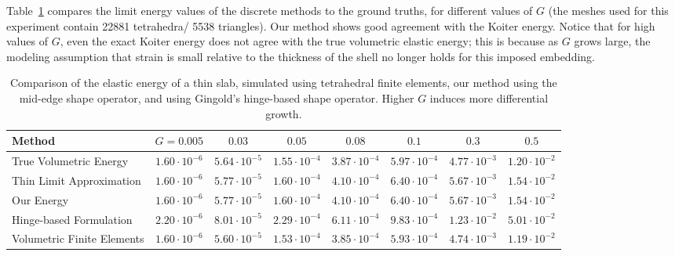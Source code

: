 \documentclass[timestamp,acmtog]{acmart}
\begin{document}
Table~\ref{tab:energy} compares the limit energy values of the discrete methods to the ground truths, for different values of $G$ (the meshes used for this experiment contain 22881 tetrahedra/ 5538 triangles).  Our method shows good agreement with the Koiter energy. Notice that for high values of $G$, even the exact Koiter energy does not agree with the true volumetric elastic energy; this is because as $G$ grows large, the modeling assumption that strain is small relative to the thickness of the shell no longer holds for this imposed embedding.
\begin{table}
\begin{tabular}{l|ccccccc}
Method & $G=0.005$ & $0.03$ & $0.05$ & $0.08$ & $0.1$ & $0.3$ & $0.5$  \\
\hline
True Volumetric Energy & $1.60\cdot 10^{-6}$ & $5.64 \cdot 10^{-5}$ & $1.55 \cdot 10^{-4}$ & $3.87 \cdot 10^{-4}$ & $5.97 \cdot 10^{-4}$ & $4.77 \cdot 10^{-3}$ & $1.20 \cdot 10^{-2}$ \\
Thin Limit Approximation & $1.60\cdot 10^{-6}$ & $5.77\cdot 10^{-5}$  &  $1.60\cdot10^{-4}$ & $4.10\cdot 10^{-4}$ & $6.40 \cdot 10^{-4}$ & $5.67 \cdot 10^{-3}$ & $1.54\cdot 10^{-2}$\\
\hline
Our Energy & $1.60 \cdot 10^{-6}$ & $5.77 \cdot 10^{-5}$ & $1.60 \cdot 10^{-4}$ & $4.10 \cdot 10^{-4}$ & $6.40 \cdot 10^{-4}$ & $5.67 \cdot 10^{-3}$ & $1.54 \cdot 10^{-2}$ \\
Hinge-based Formulation & $2.20 \cdot 10^{-6}$ & $8.01 \cdot 10^{-5}$ & $2.29 \cdot 10^{-4}$ & $6.11 \cdot 10^{-4}$ & $9.83 \cdot 10^{-4}$ & $1.23 \cdot 10^{-2}$ & $5.01 \cdot 10^{-2}$ \\
Volumetric Finite Elements & $1.60 \cdot 10^{-6}$ & $5.60 \cdot 10^{-5}$ & $1.53 \cdot 10^{-4}$ & $3.85 \cdot 10^{-4}$ & $5.93 \cdot 10^{-4}$ & $4.74 \cdot 10^{-3}$ & $1.19 \cdot 10^{-2}$
\end{tabular}
\caption{Comparison of the elastic energy of a thin slab, simulated using tetrahedral finite elements, our method using the mid-edge shape operator, and using Gingold's hinge-based shape operator. Higher $G$ induces more differential growth.}
\label{tab:energy}
\end{table}
\end{document}
